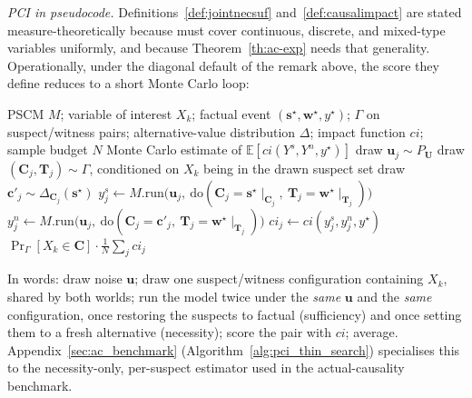 \medskip\noindent\textit{PCI in pseudocode.} Definitions~\ref{def:jointnecsuf}
and~\ref{def:causalimpact} are stated measure-theoretically because \ourapproach must
cover continuous, discrete, and mixed-type variables uniformly, and because Theorem~\ref{th:ac-exp} needs that generality. Operationally, under the
diagonal default of the remark above, the score they define reduces to a
short Monte Carlo loop:

\begin{algorithm}[htbp]
\caption{Monte Carlo estimator for $\mathbb{E}[ci]$ (diagonal default)}
\label{alg:pci_generic}
\begin{algorithmic}[1]
\Require PSCM $M$; variable of interest $X_k$; factual event $(\mathbf{s}^\star,\mathbf{w}^\star,y^\star)$;
$\Gamma$ on suspect/witness pairs; alternative-value distribution $\Delta$; impact function $ci$; sample budget $N$
\Ensure Monte Carlo estimate of $\mathbb{E}[ci(Y^s,Y^n,y^\star)]$
  \State draw $\mathbf{u}_j\sim P_{\mathbf{U}}$
  \State draw $(\mathbf{C}_j,\mathbf{T}_j)\sim\Gamma$, conditioned on
         $X_k$ being in the drawn suspect set 
  \State draw $\mathbf{c}'_j\sim\Delta_{\mathbf{C}_j}(\mathbf{s}^\star)$
  \State $y^s_j \gets M.\mathrm{run}\bigl(\mathbf{u}_j,\ \mathrm{do}(\mathbf{C}_j=\mathbf{s}^\star\!\mid_{\mathbf{C}_j},\ \mathbf{T}_j=\mathbf{w}^\star\!\mid_{\mathbf{T}_j})\bigr)$ 
  \State $y^n_j \gets M.\mathrm{run}\bigl(\mathbf{u}_j,\ \mathrm{do}(\mathbf{C}_j=\mathbf{c}'_j,\ \mathbf{T}_j=\mathbf{w}^\star\!\mid_{\mathbf{T}_j})\bigr)$ 
  \State $ci_j \gets ci(y^s_j, y^n_j, y^\star)$
\EndFor
\State \Return $\Pr_\Gamma[X_k\in\mathbf{C}]\cdot\frac{1}{N}\sum_j ci_j$
\end{algorithmic}
\end{algorithm}

\noindent In words: draw noise $\mathbf{u}$; draw one suspect/witness configuration
containing $X_k$, shared by both worlds; run the model twice under
the \emph{same} $\mathbf{u}$ and the \emph{same} configuration, once restoring the
suspects to factual (sufficiency) and once setting them to a fresh alternative
(necessity); score the pair with $ci$; average.
Appendix~\ref{sec:ac_benchmark} (Algorithm~\ref{alg:pci_thin_search}) specialises this
to the necessity-only, per-suspect estimator used in the actual-causality benchmark.

